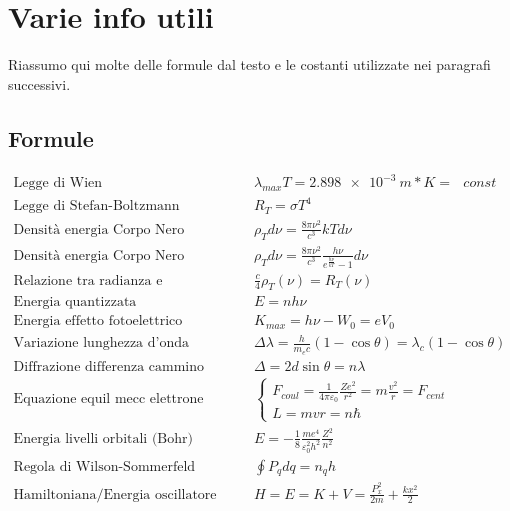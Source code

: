 

\section{Varie info utili}
Riassumo qui molte delle formule dal testo e le costanti utilizzate nei paragrafi successivi.


\subsection{Formule}
\begin{equation}
\begin{split}
\mbox{Legge di Wien} & \quad \lambda_{max} T = \SI{2.898e-3}{m*K} = \mbox{ } const \\
\mbox{Legge di Stefan-Boltzmann} & \quad R_T = \sigma T^4 \\
\mbox{Densità energia Corpo Nero Raylight-Jeans} & \quad \rho_T d\nu = \frac{ 8 \pi \nu^2}{c^3 } kT d\nu \\
\mbox{Densità energia Corpo Nero Planck} & \quad  \rho_T d\nu = \frac{ 8 \pi \nu^2}{c^3 }\frac{ h\nu}{e^{ \frac{ h\nu}{kT } } - 1 } d\nu  \\
\mbox{Relazione tra radianza e radiazione di cavità} & \quad \frac{ c}{4 } \rho_T(\nu) = R_T(\nu) \\
\mbox{Energia quantizzata} & \quad E = n h \nu \\
\mbox{Energia effetto fotoelettrico} & \quad K_{max} = h\nu - W_0 = eV_0 \\
\mbox{Variazione lunghezza d'onda effetto Compton} & \quad \Delta \lambda = \frac{ h}{m_{e} c } (1 - \cos \theta) = \lambda_c (1 - \cos \theta) \\
\mbox{Diffrazione differenza cammino ottico} & \quad \Delta = 2 d \sin \theta = n \lambda \\
\mbox{Equazione equil mecc elettrone (Bohr)} & \quad 
\begin{cases}
F_{coul} = \frac{ 1}{4 \pi \varepsilon_0 } \frac{ Z e^2}{r^2 } = m \frac{ v^2}{r } = F_{cent} \\
L = m v r =  n \hbar
\end{cases} \\
\mbox{Energia livelli orbitali (Bohr)} & \quad E = -\frac{ 1}{8 } \frac{ m e^4}{\varepsilon_0^2 h^2 } \frac{ Z^2}{n^2 } \\
\mbox{Regola di Wilson-Sommerfeld} & \quad \oint P_q dq = n_q h \\
\mbox{Hamiltoniana/Energia oscillatore armonico} & \quad H = E = K + V = \frac{ P_x^2}{2m } + \frac{ k x^2}{2 } \\

\end{split}
\end{equation}
